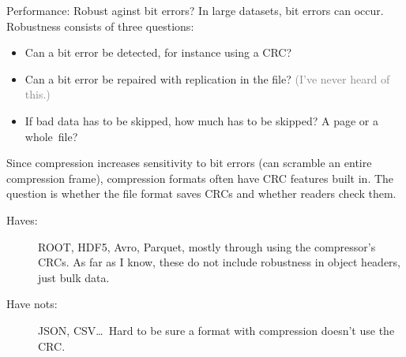 \documentclass[aspectratio=169]{beamer}
\begin{document}
\begin{frame}{Performance: Robust aginst bit errors?}
\vspace{0.5 cm}
In large datasets, bit errors can occur. Robustness consists of three questions:
\begin{itemize}
\item Can a bit error be detected, for instance using a CRC?
\item Can a bit error be repaired with replication in the file? \textcolor{gray}{(I've never heard of this.)}
\item If bad data has to be skipped, how much has to be skipped? A page or a \mbox{whole file?\hspace{-1 cm}}
\end{itemize}

\vfill

Since compression increases sensitivity to bit errors (can scramble an entire compression frame), compression formats often have CRC features built in. The question is whether the file format saves CRCs and whether readers check them.

\vfill

\begin{description}
\item[Haves:] ROOT, HDF5, Avro, Parquet, mostly through using the compressor's CRCs. As far as I know, these do not include robustness in object headers, just bulk data.
\item[Have nots:] JSON, CSV\ldots\ Hard to be sure a format with compression doesn't use the CRC.
\end{description}
\end{frame}
\end{document}
